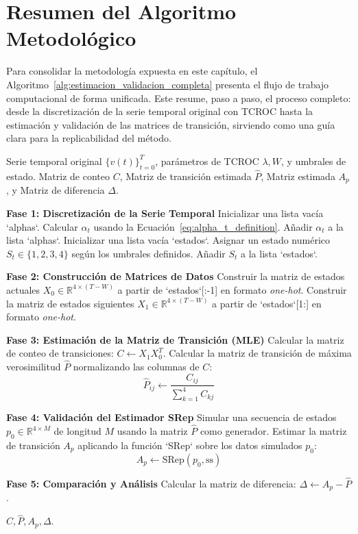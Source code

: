 \section{Resumen del Algoritmo Metodológico}

Para consolidar la metodología expuesta en este capítulo, el Algoritmo~\ref{alg:estimacion_validacion_completa} presenta el flujo de trabajo computacional de forma unificada. Este resume, paso a paso, el proceso completo: desde la discretización de la serie temporal original con TCROC hasta la estimación y validación de las matrices de transición, sirviendo como una guía clara para la replicabilidad del método.


\begin{algorithm}[H]
\caption{Algoritmo para la Estimación y Validación de la Matriz de Transición}
\label{alg:estimacion_validacion_completa}
\begin{algorithmic}[1]
\Require Serie temporal original $\{v(t)\}_{t=0}^T$, parámetros de TCROC \(\lambda, W\), y umbrales de estado.
\Ensure Matriz de conteo \(C\), Matriz de transición estimada \(\hat{P}\), Matriz estimada \(A_p\), y Matriz de diferencia \(\Delta\).

\State \textbf{Fase 1: Discretización de la Serie Temporal}
\State Inicializar una lista vacía `alphas`.
    \State Calcular \(\alpha_t\) usando la Ecuación~\ref{eq:alpha_t_definition}.
    \State Añadir \(\alpha_t\) a la lista `alphas`.
\EndFor
\State Inicializar una lista vacía `estados`.
    \State Asignar un estado numérico \(S_t \in \{1, 2, 3, 4\}\) según los umbrales definidos.
    \State Añadir \(S_t\) a la lista `estados`.
\EndFor

\State \textbf{Fase 2: Construcción de Matrices de Datos}
\State Construir la matriz de estados actuales \(X_0 \in \mathbb{R}^{4 \times (T-W)}\) a partir de `estados`[:-1] en formato \textit{one-hot}.
\State Construir la matriz de estados siguientes \(X_1 \in \mathbb{R}^{4 \times (T-W)}\) a partir de `estados`[1:] en formato \textit{one-hot}.

\State \textbf{Fase 3: Estimación de la Matriz de Transición (MLE)}
\State Calcular la matriz de conteo de transiciones: \(C \leftarrow X_1 X_0^T\).
\State Calcular la matriz de transición de máxima verosimilitud \(\hat{P}\) normalizando las columnas de \(C\):
\[ \hat{P}_{ij} \leftarrow \frac{C_{ij}}{\sum_{k=1}^4 C_{kj}} \]

\State \textbf{Fase 4: Validación del Estimador SRep}
\State Simular una secuencia de estados \(p_0 \in \mathbb{R}^{4 \times M}\) de longitud \(M\) usando la matriz \(\hat{P}\) como generador.
\State Estimar la matriz de transición \(A_p\) aplicando la función `SRep` sobre los datos simulados \(p_0\):
\[ A_p \leftarrow \text{SRep}(p_0, \text{ss}) \]

\State \textbf{Fase 5: Comparación y Análisis}
\State Calcular la matriz de diferencia: \(\Delta \leftarrow A_p - \hat{P}\).

\State \Return \(C, \hat{P}, A_p, \Delta\).
\end{algorithmic}
\end{algorithm}

